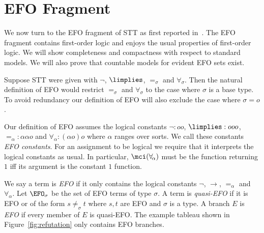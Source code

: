 \section{EFO Fragment}



We now turn to the EFO fragment of STT as first reported in~\cite{BrownSmolkaEFO}.
The EFO fragment contains first-order logic
and enjoys the usual properties of first-order logic.
We will show completeness and compactness with respect to standard models.
We will also prove that countable models for evident EFO sets exist.

Suppose STT were given with $\neg$, $\limplies$, $=_\sigma$ and $\forall_{\!\sigma}$.
Then the natural definition of EFO would restrict
$=_\sigma$ and $\forall_{\!\sigma}$ to the case where $\sigma$ is a base type.
To avoid redundancy our definition of EFO will also exclude the case where $\sigma = o$.

Our definition of EFO assumes the logical constants $\neg:oo$, $\limplies:ooo$,
$=_\alpha:\alpha\alpha o$ and $\forall_{\!\alpha}:(\alpha o)o$ where
$\alpha$ ranges over sorts.  We call these constants \emph{EFO constants}.
For an assignment to be logical we require that it interprets the logical
constants as usual.  In particular, $\mci(\forall_{\!\alpha})$ must be
the function returning $1$ iff its argument is the constant $1$ function.

We say a term is \emph{EFO} if it only contains the logical constants $\neg$, $\to$, $=_\alpha$ and $\forall_{\!\alpha}$.
Let \emph{$\EFO_\sigma$} be the set of EFO terms of type $\sigma$.
A term is \emph{quasi-EFO} if it is EFO or of the form $s\not=_{\sigma} t$ where $s,t$ are EFO
and $\sigma$ is a type. A branch $E$ is \emph{EFO} if every member of $E$ is quasi-EFO.
The example tableau shown in Figure~\ref{fig:refutation} only contains EFO branches.

